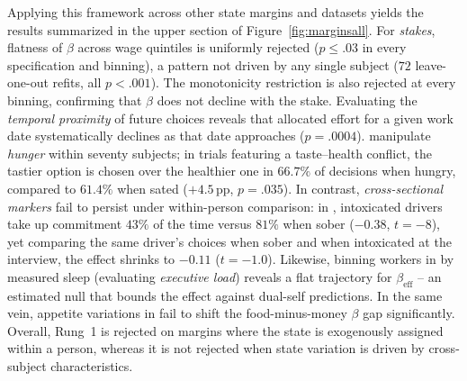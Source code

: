 \documentclass[11pt,a4paper]{article}
\theoremstyle{plain}
\theoremstyle{definition}
\newcommand{\beff}{\beta_{\mathrm{eff}}}
\begin{document}
Applying this framework across other state margins and datasets yields the results summarized in the upper section of Figure~\ref{fig:marginsall}. 
For \emph{stakes}, flatness of $\beta$ across wage quintiles is uniformly rejected ($p \le .03$ in every specification and binning), a pattern not driven by any single subject ($72$ leave-one-out refits, all $p < .001$). 
The monotonicity restriction is also rejected at every binning, confirming that $\beta$ does not decline with the stake. 
Evaluating the \emph{temporal proximity} of future choices reveals that allocated effort for a given work date systematically declines as that date approaches ($p = .0004$).
\citet{marchgluth2025} manipulate \textit{hunger} within seventy subjects; in trials featuring a taste--health conflict, the tastier option is chosen over the healthier one in $66.7\%$ of decisions when hungry, compared to $61.4\%$ when sated ($+4.5$\,pp, $p = .035$).
In contrast, \emph{cross-sectional markers} fail to persist under within-person comparison: in \citet{schilbach2019}, intoxicated drivers take up commitment $43\%$ of the time versus $81\%$ when sober ($-0.38$, $t = -8$), 
yet comparing the same driver's choices when sober and when intoxicated at the interview, the effect shrinks to $-0.11$ ($t = -1.0$). 
Likewise, binning workers in \citet{bessone2021} by measured sleep (evaluating \emph{executive load}) reveals a flat trajectory for $\beff$ -- an estimated null that bounds the effect against dual-self predictions. In the same vein, appetite variations in \citet{cheung2022} fail to shift the food-minus-money $\beta$ gap significantly.
Overall, Rung~1 is rejected on margins where the state is exogenously assigned within a person, whereas it is not rejected when state variation is driven by cross-subject characteristics. %

\end{document}
